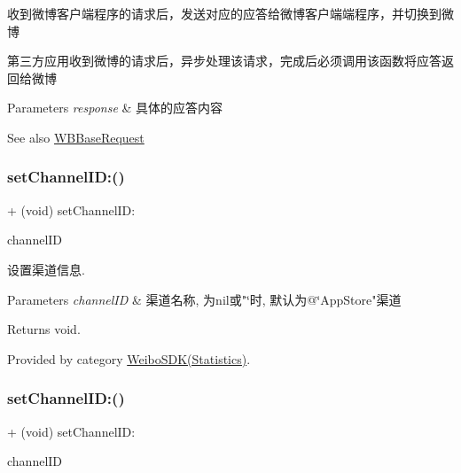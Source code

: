 收到微博客户端程序的请求后，发送对应的应答给微博客户端端程序，并切换到微博

第三方应用收到微博的请求后，异步处理该请求，完成后必须调用该函数将应答返回给微博


\begin{DoxyParams}{Parameters}
{\em response} & 具体的应答内容 \\
\hline
\end{DoxyParams}
\begin{DoxySeeAlso}{See also}
\mbox{\hyperlink{interface_w_b_base_request}{W\+B\+Base\+Request}} 
\end{DoxySeeAlso}
\mbox{\label{interface_weibo_s_d_k_a8d9fad53942642ec304ecba4734e05c1}} 
\subsubsection{\texorpdfstring{set\+Channel\+I\+D\+:()}{setChannelID:()}\hspace{0.1cm}{\footnotesize\ttfamily [1/3]}}
{\footnotesize\ttfamily + (void) set\+Channel\+I\+D\+: \begin{DoxyParamCaption}\item[{(N\+S\+String $\ast$)}]{channel\+ID }\end{DoxyParamCaption}}

设置渠道信息. 
\begin{DoxyParams}{Parameters}
{\em channel\+ID} & 渠道名称, 为nil或"\char`\"{}时, 默认为@\char`\"{}App\+Store"渠道 \\
\hline
\end{DoxyParams}
\begin{DoxyReturn}{Returns}
void. 
\end{DoxyReturn}


Provided by category \mbox{\hyperlink{category_weibo_s_d_k_07_statistics_08_a8d9fad53942642ec304ecba4734e05c1}{Weibo\+S\+D\+K(\+Statistics)}}.

\mbox{\label{interface_weibo_s_d_k_a8d9fad53942642ec304ecba4734e05c1}} 
\subsubsection{\texorpdfstring{set\+Channel\+I\+D\+:()}{setChannelID:()}\hspace{0.1cm}{\footnotesize\ttfamily [2/3]}}
{\footnotesize\ttfamily + (void) set\+Channel\+I\+D\+: \begin{DoxyParamCaption}\item[{(N\+S\+String $\ast$)}]{channel\+ID }\end{DoxyParamCaption}}

